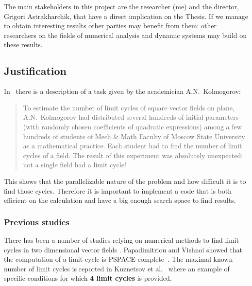 The main stakeholders in this project are the researcher (me) and the director,
Grigori Astrakharchik, that have a direct implication on the Thesis. If we manage
to obtain interesting results other parties may benefit from them: other
researchers on the fields of numerical analysis and dynamic systems may build on
these results.

\pagebreak
\subsection{Justification}

In~\cite{kuznetsov_visualization_2013} there is a description of a task given by
the academician A.N.~Kolmogorov:

\begin{quote}
To estimate the number of limit cycles of square vector fields on plane, A.N.~Kolmogorov had distributed several hundreds of initial parameters (with randomly chosen coefficients of quadratic expressions) among a few hundreds of students of Mech \& Math Faculty of Moscow State University as a mathematical practice. Each student had to find the number of limit cycles of a field. The result of this experiment was absolutely unexpected: not a single field had a limit cycle!
\end{quote}

This shows that the parallelizable nature of the problem and how difficult it is to find those cycles. Therefore it is important to implement a code that is both efficient on the calculation and have a big enough search space to find results.

\subsubsection{Previous studies}

There has been a number of studies relying on numerical methods to find limit cycles in two dimensional vector fields
\cite{leonov_hidden_2013,van_der_hoff_numerical_2013,casades_computation_2013,gasull_effective_2015}.
Papadimitriou and Vishnoi showed that the computation of a limit cycle is
PSPACE-complete~\cite{papadimitriou_computational_2015}.
The maximal known number of limit cycles is reported in Kuznetsov et al.~\cite{kuznetsov_visualization_2013} where an example of specific conditions for which \textbf{4 limit cycles} is provided.

